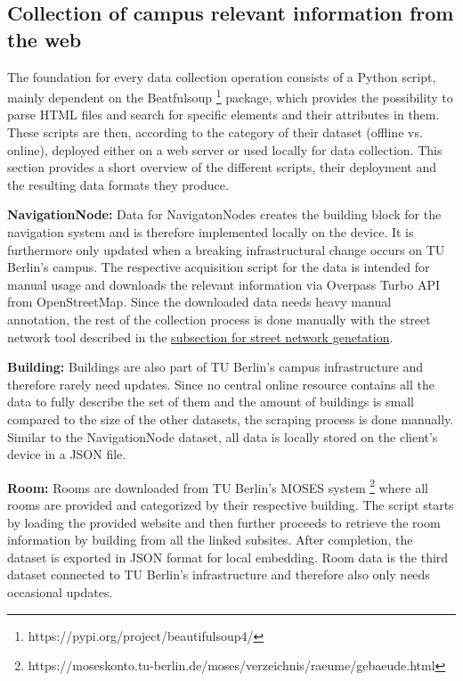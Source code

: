 \subsection{Collection of campus relevant information from the web}
The foundation for every data collection operation consists of a Python script, mainly dependent on the Beatfulsoup \footnote{https://pypi.org/project/beautifulsoup4/} package, which provides the possibility to parse HTML files and search for specific elements and their attributes in them. These scripts are then, according to the category of their dataset (offline vs. online), deployed either on a web server or used locally for data collection. This section provides a short overview of the different scripts, their deployment and the resulting data formats they produce.

\textbf{NavigationNode:} Data for NavigatonNodes creates the building block for the navigation system and is therefore implemented locally on the device. It is furthermore only updated when a breaking infrastructural change occurs on TU Berlin's campus. The respective acquisition script for the data is intended for manual usage and downloads the relevant information via Overpass Turbo API from OpenStreetMap. Since the downloaded data needs heavy manual annotation, the rest of the collection process is done manually with the street network tool described in the \hyperref[sub_sec:street_network_generation]{subsection for street network genetation}.

\textbf{Building:} Buildings are also part of TU Berlin's campus infrastructure and therefore rarely need updates. Since no central online resource contains all the data to fully describe the set of them and the amount of buildings is small compared to the size of the other datasets, the scraping process is done manually. Similar to the NavigationNode dataset, all data is locally stored on the client's device in a JSON file.

\textbf{Room:} Rooms are downloaded from TU Berlin's MOSES system \footnote{https://moseskonto.tu-berlin.de/moses/verzeichnis/raeume/gebaeude.html} where all rooms are provided and categorized by their respective building. The script starts by loading the provided website and then further proceeds to retrieve the room information by building from all the linked subsites. After completion, the dataset is exported in JSON format for local embedding. Room data is the third dataset connected to TU Berlin's infrastructure and therefore also only needs occasional updates.

